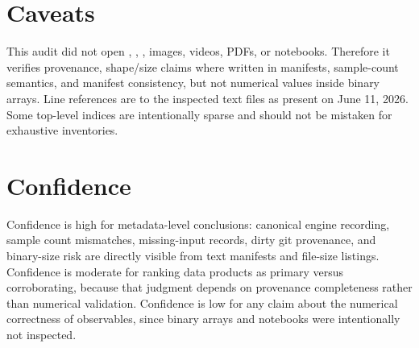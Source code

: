 \documentclass[aps,prb,onecolumn,nofootinbib,superscriptaddress]{revtex4-2}
\newcommand{\repo}[1]{\texttt{\detokenize{#1}}}
\begin{document}
\section{Caveats}

This audit did not open \repo{.npz}, \repo{.npy}, \repo{.parquet}, images, videos, PDFs,
or notebooks.  Therefore it verifies provenance, shape/size claims where written in
manifests, sample-count semantics, and manifest consistency, but not numerical values
inside binary arrays.  Line references are to the inspected text files as present on
June 11, 2026.  Some top-level indices are intentionally sparse and should not be
mistaken for exhaustive inventories.

\section{Confidence}

Confidence is high for metadata-level conclusions: canonical engine recording, sample
count mismatches, missing-input records, dirty git provenance, and binary-size risk are
directly visible from text manifests and file-size listings.  Confidence is moderate for
ranking data products as primary versus corroborating, because that judgment depends on
provenance completeness rather than numerical validation.  Confidence is low for any
claim about the numerical correctness of observables, since binary arrays and notebooks
were intentionally not inspected.
\end{document}
